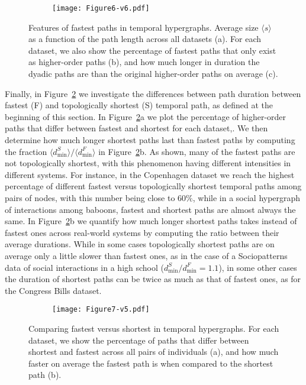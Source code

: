 \documentclass[a4paper,pre,reqno,superscriptaddress, twocolumn, floatfix]{revtex4}
\def\ho{higher-order }
\begin{document}
\begin{figure}[ht]
    \begin{subfigure}{\linewidth}
   \texttt{[image: Figure6-v6.pdf]}
  \end{subfigure}%
    \caption{ \justifying  
    Features of fastest paths in temporal hypergraphs. Average size $\langle{s}\rangle$ as a function of the path length across all datasets (a). 
    For each dataset, we also show the percentage of fastest paths that only exist as \ho paths (b), and how much longer in duration the dyadic paths are than the original \ho paths on average (c). %
    }
    \label{fig:6}
\end{figure}


Finally, in Figure~\ref{fig:7} we investigate the differences between path duration between fastest (F) and topologically shortest (S) temporal path, as defined at the beginning of this section. 
In Figure~\ref{fig:7}a we plot the percentage of \ho paths that differ between fastest and shortest for each dataset,. We then determine how much longer shortest paths last than fastest paths by computing the fraction 
$\langle{d_{\min}^{S}\rangle} / \langle {d_{\min}^{F}}\rangle$ in Figure~\ref{fig:7}b. As shown, many of the fastest paths are not topologically shortest, with this phenomenon having different intensities in different systems. For instance, in the Copenhagen dataset we reach the highest percentage of different fastest versus topologically shortest temporal paths among pairs of nodes, with this number being close to $60\%$, while in a social hypergraph of interactions among baboons, fastest and shortest paths are almost always the same. In Figure~\ref{fig:7}b we quantify how much longer shortest paths takes instead of fastest ones across real-world systems by computing the ratio between their average durations. While in some cases topologically shortest paths are on average only a little slower than fastest ones, as in the case of a Sociopatterns data of social interactions in a high school ($d_{\min}^{S}/d_{\min}^{F}=1.1$), in some other cases the duration of shortest paths can be twice as much as that of fastest ones, as for the Congress Bills dataset.
 


\begin{figure}[ht]
    \begin{subfigure}{\linewidth}
   \texttt{[image: Figure7-v5.pdf]}
  \end{subfigure}%
    \caption{ \justifying
    Comparing fastest versus shortest in temporal hypergraphs.  
    For each dataset, we show the percentage of paths that differ between shortest and fastest across all pairs of individuals (a), and how much faster on average the fastest path is when compared to the shortest path (b). 
    }
    \label{fig:7}
\end{figure}
\end{document}
